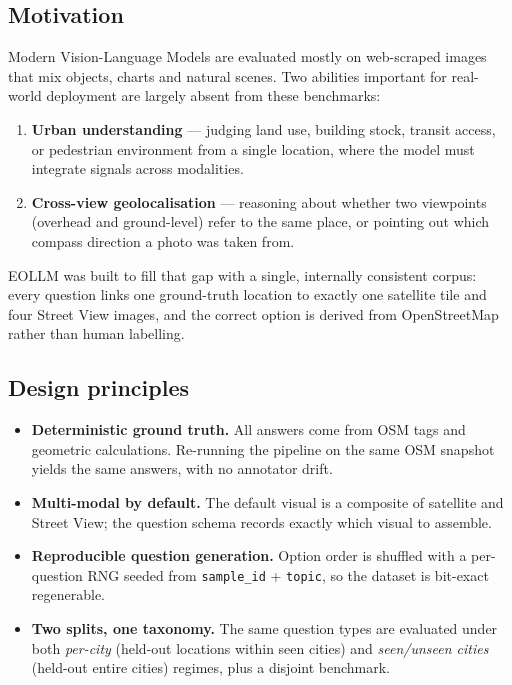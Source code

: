 \documentclass[11pt,a4paper]{article}
\begin{document}
\subsection{Motivation}
Modern Vision-Language Models are evaluated mostly on web-scraped images
that mix objects, charts and natural scenes. Two abilities important for
real-world deployment are largely absent from these benchmarks:

\begin{enumerate}[itemsep=2pt]
  \item \textbf{Urban understanding} --- judging land use, building stock,
        transit access, or pedestrian environment from a single
        location, where the model must integrate signals across modalities.
  \item \textbf{Cross-view geolocalisation} --- reasoning about whether two
        viewpoints (overhead and ground-level) refer to the same place,
        or pointing out which compass direction a photo was taken from.
\end{enumerate}

\noindent EOLLM was built to fill that gap with a single, internally
consistent corpus: every question links one ground-truth location to
exactly one satellite tile and four Street View images, and the
correct option is derived from OpenStreetMap rather than human labelling.

\subsection{Design principles}
\begin{itemize}[itemsep=2pt]
  \item \textbf{Deterministic ground truth.} All answers come from
        OSM tags and geometric calculations. Re-running the pipeline
        on the same OSM snapshot yields the same answers, with no
        annotator drift.
  \item \textbf{Multi-modal by default.} The default visual is a
        composite of satellite and Street View; the question schema
        records exactly which visual to assemble.
  \item \textbf{Reproducible question generation.} Option order is
        shuffled with a per-question RNG seeded from
        \texttt{sample\_id} + \texttt{topic}, so the dataset is
        bit-exact regenerable.
  \item \textbf{Two splits, one taxonomy.} The same question types are
        evaluated under both \emph{per-city} (held-out locations within
        seen cities) and \emph{seen/unseen cities} (held-out entire
        cities) regimes, plus a disjoint benchmark.
\end{itemize}
\end{document}
